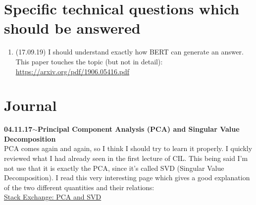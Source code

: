 \documentclass[11pt,a4paper]{article}
\newenvironment{loggentry}[2]%
{\noindent\textbf{#1}\hspace{1cm}$\mathbf{\sim}$\text{ }\textbf{#2}\\}{\vspace{0.5cm}}
\begin{document}
\section{Specific technical questions which should be answered}
\begin{enumerate}
\item (17.09.19) I should understand exactly how BERT can generate an answer. This paper touches the topic (but not in detail):\\
\url{https://arxiv.org/pdf/1906.05416.pdf}
\end{enumerate}

\section{Journal}

\begin{loggentry}{04.11.17}{Principal Component Analysis (PCA) and Singular Value Decomposition}
PCA comes again and again, so I think I should try to learn it properly. I quickly reviewed what I had already seen in the first lecture of CIL. This being said I'm not use that it is exactly the PCA, since it's called SVD (Singular Value Decomposition). I read this very interesting page which gives a good explanation of the two different quantities and their relations:\\
\href{https://stats.stackexchange.com/questions/134282/relationship-between-svd-and-pca-how-to-use-svd-to-perform-pca#134283}{Stack Exchange: PCA and SVD}\\
\end{loggentry}
\end{document}
